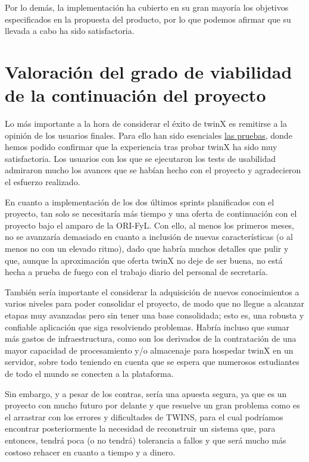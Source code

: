 Por lo demás, la implementación ha cubierto en su gran mayoría los objetivos especificados en la propuesta del producto, por lo que podemos afirmar que su llevada a cabo ha sido satisfactoria.

\section{Valoración del grado de viabilidad de la continuación del proyecto}

Lo más importante a la hora de considerar el éxito de twinX es remitirse a la opinión de los usuarios finales. Para ello han sido esenciales \hyperref[pruebas]{las pruebas}, donde hemos podido confirmar que la experiencia tras probar twinX ha sido muy satisfactoria. Los usuarios con los que se ejecutaron los tests de usabilidad admiraron mucho los avances que se habían hecho con el proyecto y agradecieron el esfuerzo realizado.

En cuanto a implementación de los dos últimos sprints planificados con el proyecto, tan solo se necesitaría más tiempo y una oferta de continuación con el proyecto bajo el amparo de la ORI-FyL. Con ello, al menos los primeros meses, no se avanzaría demasiado en cuanto a inclusión de nuevas características (o al menos no con un elevado ritmo), dado que habría muchos detalles que pulir y que, aunque la aproximación que oferta twinX no deje de ser buena, no está hecha a prueba de fuego con el trabajo diario del personal de secretaría.

También sería importante el considerar la adquisición de nuevos conocimientos a varios niveles para poder consolidar el proyecto, de modo que no llegue a alcanzar etapas muy avanzadas pero sin tener una base consolidada; esto es, una robusta y confiable aplicación que siga resolviendo problemas. Habría incluso que sumar más gastos de infraestructura, como son los derivados de la contratación de una mayor capacidad de procesamiento y/o almacenaje para hospedar twinX en un servidor, sobre todo teniendo en cuenta que se espera que numerosos estudiantes de todo el mundo se conecten a la plataforma.

Sin embargo, y a pesar de los contras, sería una apuesta segura, ya que es un proyecto con mucho futuro por delante y que resuelve un gran problema como es el arrastrar con los errores y dificultades de TWINS, para el cual podríamos encontrar posteriormente la necesidad de reconstruir un sistema que, para entonces, tendrá poca (o no tendrá) tolerancia a fallos y que será mucho más costoso rehacer en cuanto a tiempo y a dinero.

